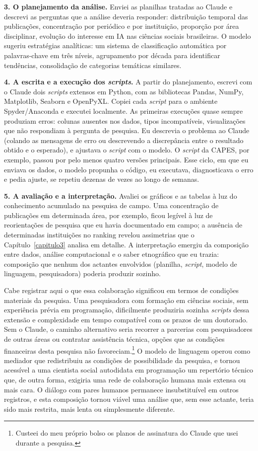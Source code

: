 \textbf{3. O planejamento da análise.} Enviei as planilhas tratadas ao Claude e descrevi as perguntas que a análise deveria responder: distribuição temporal das publicações, concentração por periódico e por instituição, proporção por área disciplinar, evolução do interesse em IA nas ciências sociais brasileiras. O modelo sugeriu estratégias analíticas: um sistema de classificação automática por palavras-chave em três níveis, agrupamento por década para identificar tendências, consolidação de categorias temáticas similares.

\textbf{4. A escrita e a execução dos \textit{scripts}.} A partir do planejamento, escrevi com o Claude dois \textit{scripts} extensos em Python, com as bibliotecas Pandas, NumPy, Matplotlib, Seaborn e OpenPyXL. Copiei cada \textit{script} para o ambiente Spyder/Anaconda e executei localmente. As primeiras execuções quase sempre produziam erros: colunas ausentes nos dados, tipos incompatíveis, visualizações que não respondiam à pergunta de pesquisa. Eu descrevia o problema ao Claude (colando as mensagens de erro ou descrevendo a discrepância entre o resultado obtido e o esperado), e ajustava o \textit{script} com o modelo. O \textit{script} da CAPES, por exemplo, passou por pelo menos quatro versões principais. Esse ciclo, em que eu enviava os dados, o modelo propunha o código, eu executava, diagnosticava o erro e pedia ajuste, se repetiu dezenas de vezes ao longo de semanas.

\textbf{5. A avaliação e a interpretação.} Avaliei os gráficos e as tabelas à luz do conhecimento acumulado na pesquisa de campo. Uma concentração de publicações em determinada área, por exemplo, ficou legível à luz de reorientações de pesquisa que eu havia documentado em campo; a ausência de determinadas instituições no ranking revelou assimetrias que o Capítulo~\ref{capitulo3} analisa em detalhe. A interpretação emergiu da composição entre dados, análise computacional e o saber etnográfico que eu trazia: composição que nenhum dos actantes envolvidos (planilha, \textit{script}, modelo de linguagem, pesquisadora) poderia produzir sozinho.

\bigskip

Cabe registrar aqui o que essa colaboração significou em termos de condições materiais da pesquisa. Uma pesquisadora com formação em ciências sociais, sem experiência prévia em programação, dificilmente produziria sozinha \textit{scripts} dessa extensão e complexidade em tempo compatível com os prazos de um doutorado. Sem o Claude, o caminho alternativo seria recorrer a parcerias com pesquisadores de outras áreas ou contratar assistência técnica, opções que as condições financeiras desta pesquisa não favoreciam.\footnote{Custeei do meu próprio bolso os planos de assinatura do Claude que usei durante a pesquisa.} O modelo de linguagem operou como mediador que redistribuiu as condições de possibilidade da pesquisa, e tornou acessível a uma cientista social autodidata em programação um repertório técnico que, de outra forma, exigiria uma rede de colaboração humana mais extensa ou mais cara. O diálogo com pares humanos permanece insubstituível em outros registros, e esta composição tornou viável uma análise que, sem esse actante, teria sido mais restrita, mais lenta ou simplesmente diferente.

